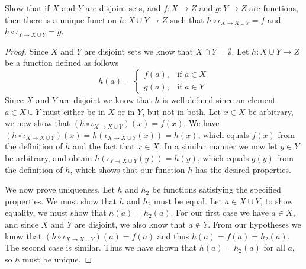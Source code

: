 \documentclass[12pt]{article}
\newenvironment{exercise}[2][Exercise]{\begin{trivlist}
\item[\hskip \labelsep {\bfseries #1}\hskip \labelsep {\bfseries #2}]}{\end{trivlist}}
\begin{document}
\begin{exercise}{3.3.8d}
	Show that if $ X $ and $ Y $ are disjoint sets, and $ f : X \to Z $ and $ g : Y \to Z $ are functions, then there is a unique function $ h : X \cup Y \to Z $ such that $ h \circ \iota_{X \to X \cup Y} = f $ and $ h \circ \iota_{Y \to X \cup Y} = g $.
\end{exercise}
\begin{proof}
	Since $ X $ and $ Y $ are disjoint sets we know that $ X \cap Y = \emptyset $.
	Let $ h : X \cup Y \to Z $ be a function defined as follows
	\[
	h(a) =
	\begin{cases}
		f(a), & \text{if } a \in X
		\\ g(a), & \text{if } a \in Y
	\end{cases}
	\]
	Since $ X $ and $ Y $ are disjoint we know that $ h $ is well-defined since an element $ a \in X \cup Y $ must either be in $ X $ or in $ Y $, but not in both.
	Let $ x \in X $ be arbitrary, we now show that $ (h \circ \iota_{X \to X \cup Y})(x) = f(x) $.
	We have $ (h \circ \iota_{X \to X \cup Y})(x) = h(\iota_{X \to X \cup Y}(x)) = h(x) $, which equals $ f(x) $ from the definition of $ h $ and the fact that $ x \in X $.
	In a similar manner we now let $ y \in Y $ be arbitrary, and obtain $ h(\iota_{Y \to X \cup Y}(y)) = h(y) $, which equals $ g(y) $ from the definition of $ h $, which shows that our function $ h $ has the desired properties.
	
	We now prove uniqueness.
	Let $ h $ and $ h_{2} $ be functions satisfying the specified properties.
	We must show that $ h $ and $ h_{2} $ must be equal.
	Let $ a \in X \cup Y $, to show equality, we must show that $ h(a) = h_{2}(a) $.
	For our first case we have $ a \in X $, and since $ X $ and $ Y $ are disjoint, we also know that $ a \notin Y $.
	From our hypotheses we know that $ (h \circ \iota_{X \to X \cup Y})(a) = f(a) $ and thus $ h(a) = f(a) = h_{2}(a) $.
	The second case is similar.
	Thus we have shown that $ h(a) = h_{2}(a) $ for all $ a $, so $ h $ must be unique.
\end{proof}
\end{document}
